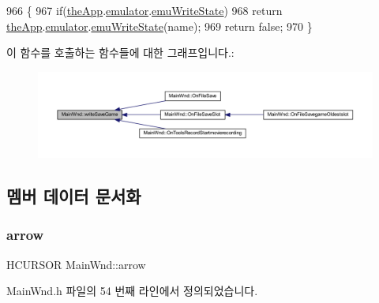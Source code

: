 \begin{DoxyCode}
966 \{
967   \textcolor{keywordflow}{if}(\mbox{\hyperlink{_v_b_a_8cpp_a8095a9d06b37a7efe3723f3218ad8fb3}{theApp}}.\mbox{\hyperlink{class_v_b_a_ab40fc008c6714c3c8670eb8a9085a4a1}{emulator}}.\mbox{\hyperlink{struct_emulated_system_a649c6ceaabee941f263a32fa8a73a9c5}{emuWriteState}})
968     \textcolor{keywordflow}{return} \mbox{\hyperlink{_v_b_a_8cpp_a8095a9d06b37a7efe3723f3218ad8fb3}{theApp}}.\mbox{\hyperlink{class_v_b_a_ab40fc008c6714c3c8670eb8a9085a4a1}{emulator}}.\mbox{\hyperlink{struct_emulated_system_a649c6ceaabee941f263a32fa8a73a9c5}{emuWriteState}}(name);
969   \textcolor{keywordflow}{return} \textcolor{keyword}{false};
970 \}
\end{DoxyCode}
이 함수를 호출하는 함수들에 대한 그래프입니다.\+:
\nopagebreak
\begin{figure}[H]
\begin{center}
\leavevmode
\includegraphics[width=350pt]{class_main_wnd_a2ce340f4f9cfbb4ec41be6ce2e33ed23_icgraph}
\end{center}
\end{figure}


\subsection{멤버 데이터 문서화}
\mbox{\label{class_main_wnd_aacb2a400730b1e95ee16792acd6a089f}} 
\subsubsection{\texorpdfstring{arrow}{arrow}}
{\footnotesize\ttfamily H\+C\+U\+R\+S\+OR Main\+Wnd\+::arrow}



Main\+Wnd.\+h 파일의 54 번째 라인에서 정의되었습니다.

\mbox{\label{class_main_wnd_adde0f53e1d63ef457254bfb346e48152}} 
